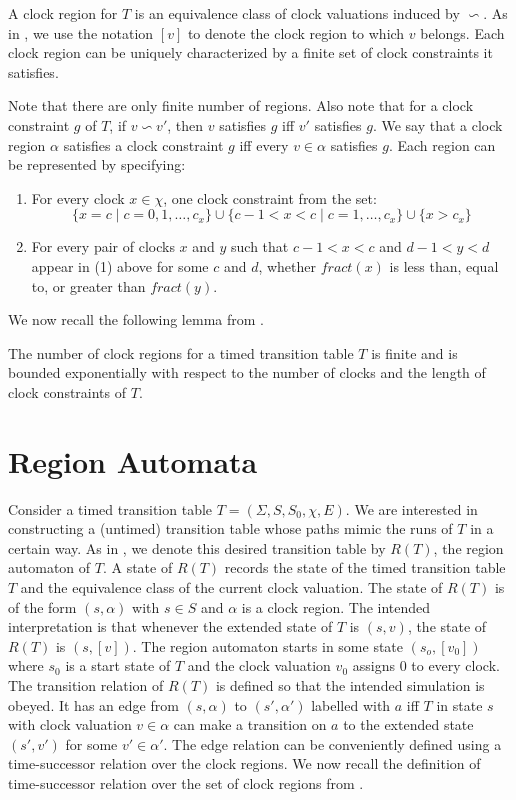 A clock region for $T$ is an equivalence class of clock valuations induced by $\backsim$. As in \cite{1}, we use the notation $[v]$ to denote the clock region to which $v$ belongs. Each clock region can be uniquely characterized by a finite set of clock constraints it satisfies.

Note that there are only finite number of regions. Also note that for a clock constraint $g$ of $T$, if $v \backsim v'$, then $v$ satisfies $g$ iff $v'$ satisfies $g$. We say that a clock region $\alpha$ satisfies a clock constraint $g$ iff every $v \in \alpha$ satisfies $g$. Each region can be represented by specifying:
\begin{enumerate}
\item For every clock $x \in \chi$, one clock constraint from the set:
\[\lbrace x = c \; \vert \; c = 0, 1, \ldots, c_{x} \rbrace \cup \lbrace c - 1 < x < c \; \vert \; c = 1, \ldots, c_{x} \rbrace \cup \lbrace x > c_{x} \rbrace\]
\item For every pair of clocks $x$ and $y$ such that $c - 1 < x < c$ and $d - 1 < y < d$ appear in (1) above for some $c$ and $d$, whether $fract(x)$ is less than, equal to, or greater than $fract(y)$.
\end{enumerate}

We now recall the following lemma from \cite{1}.

\begin{lemma}
The number of clock regions for a timed transition table $T$ is finite and is bounded exponentially with respect to the number of clocks and the length of clock constraints of $T$.
\end{lemma}

\section{Region Automata}

Consider a timed transition table $T = (\Sigma, S, S_{0}, \chi, E)$. We are interested in constructing a (untimed) transition table whose paths mimic the runs of $T$ in a certain way. As in \cite{1}, we denote this desired transition table by $R(T)$, the region automaton of $T$. A state of $R(T)$ records the state of the timed transition table $T$ and the equivalence class of the current clock valuation. The state of $R(T)$ is of the form $(s, \alpha)$ with $s \in S$ and $\alpha$ is a clock region. The intended interpretation is that whenever the extended state of $T$ is $(s, v)$, the state of $R(T)$ is $(s, [v])$. The region automaton starts in some state $(s_{o}, [v_{0}])$ where $s_{0}$ is a start state of $T$ and the clock valuation $v_{0}$ assigns $0$ to every clock. The transition relation of $R(T)$ is defined so that the intended simulation is obeyed. It has an edge from $(s, \alpha)$ to $(s', \alpha')$ labelled with $a$ iff $T$ in state $s$ with clock valuation $v \in \alpha$ can make a transition on $a$ to the extended state $(s', v')$ for some $v' \in \alpha'$. The edge relation can be conveniently defined using a time-successor relation over the clock regions. We now recall the definition of time-successor relation over the set of clock regions from \cite{1}.

